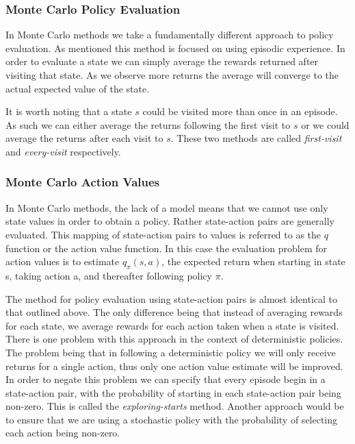 \subsubsection{Monte Carlo Policy Evaluation}
In Monte Carlo methods we take a fundamentally different approach to policy evaluation.
As mentioned this method is focused on using episodic experience.
In order to evaluate a state we can simply average the rewards returned after visiting that state.
As we observe more returns the average will converge to the actual expected value of the state.

It is worth noting that a state $s$ could be visited more than once in an episode.
As such we can either average the returns following the first visit to $s$ or we could average the returns
after each visit to $s$.
These two methods are called \textit{first-visit} and \textit{every-visit} respectively.

\subsubsection{Monte Carlo Action Values}
In Monte Carlo methods, the lack of a model means that we cannot use only state values in order to
obtain a policy.
Rather state-action pairs are generally evaluated.
This mapping of state-action pairs to values is referred to as the $q$ function or the action value function.
In this case the evaluation problem for action values is to estimate $q_\pi(s, a)$, the expected return when
starting in state s, taking action a, and thereafter following policy $\pi$\citep{sutton1998reinforcement}.

The method for policy evaluation using state-action pairs is almost identical to that outlined above.
The only difference being that instead of averaging rewards for each state, we average
rewards for each action taken when a state is visited.
There is one problem with this approach in the context of deterministic policies.
The problem being that in following a deterministic policy we will only receive returns
for a single action, thus only one action value estimate will be improved.
In order to negate this problem we can specify that every episode begin in a state-action pair,
with the probability of starting in each state-action pair being non-zero.
This is called the \textit{exploring-starts} method.
Another approach would be to ensure that we are using a stochastic policy with
the probability of selecting each action being non-zero.


